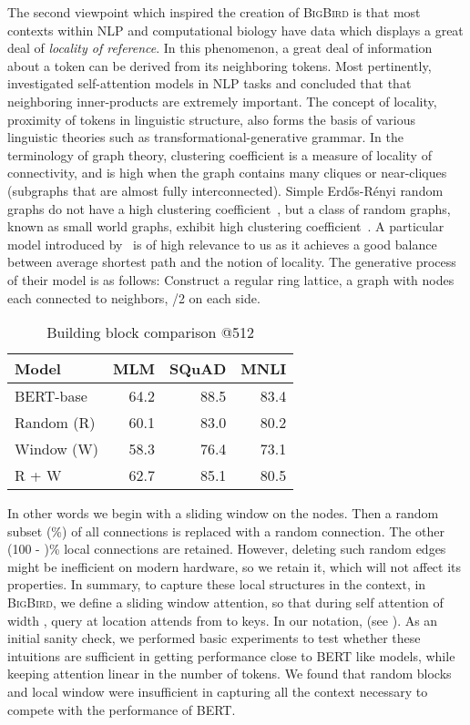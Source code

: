 \documentclass{article}
\newcommand{\bigb}{\textsc{BigBird}\xspace}
\begin{document}
The second viewpoint which inspired the creation of \bigb is that  most contexts within NLP and computational biology have data which displays a great deal of \emph{locality of reference}. 
In this phenomenon, a great deal of information about a token can be derived from its neighboring tokens. 
Most pertinently, \citet{clark2019does} investigated self-attention models in NLP tasks and concluded that that neighboring inner-products are extremely important. 
The concept of locality, proximity of tokens in linguistic structure, also forms the basis of various linguistic theories such as transformational-generative grammar.
In the terminology of graph theory, clustering coefficient is a measure of locality of connectivity, and is high when the graph contains many cliques or near-cliques (subgraphs that are almost fully interconnected).
Simple Erd\H{o}s-R\'enyi random graphs do not have a high clustering coefficient~\citep{sussman2017clusteringcoeff}, but
a class of random graphs, known as small world graphs, exhibit high clustering coefficient~\citep{watts1998collective}.
A particular model introduced by~\citet{watts1998collective} is of high relevance to us as it achieves a good balance between average shortest path and the notion of locality.
The generative process of their model is as follows:
Construct a regular ring lattice, a graph with  nodes each connected to  neighbors, /2 on each side.

\begin{wraptable}{r}{64mm}
    \vspace{-3mm}
    \centering
    \small
    \begin{tabular}{@{}lrrr@{}}
    \toprule
    Model &  MLM & SQuAD & MNLI \\
    \midrule
    BERT-base      &  64.2 & 88.5 & 83.4 \\
    Random (R)     &  60.1 & 83.0 & 80.2 \\
    Window (W)     &  58.3 & 76.4 & 73.1 \\
    R + W          &  62.7 & 85.1 & 80.5 \\
    \bottomrule
    \end{tabular}
    \caption{Building block comparison @512}
    \label{tab:init}
    \vspace{-2mm}
\end{wraptable}
In other words we begin with a sliding window on the nodes.
Then a random subset (\%) of all connections is replaced with a random connection. 
The other (100 - )\% local connections are retained.
However, deleting such random edges might be inefficient on modern hardware, so we retain it, which will not affect its properties.
In summary, to capture these local structures in the context, in \bigb, we define a sliding window attention, so that during self attention of width , query at location  attends from  to  keys.
In our notation,   (see ). 
As an initial sanity check, we performed basic experiments to test whether these intuitions are sufficient in getting performance close to BERT like models, while keeping attention linear in the number of tokens.
We found that random blocks and local window were insufficient in capturing all the context necessary to 
compete with the performance of BERT.
\end{document}
